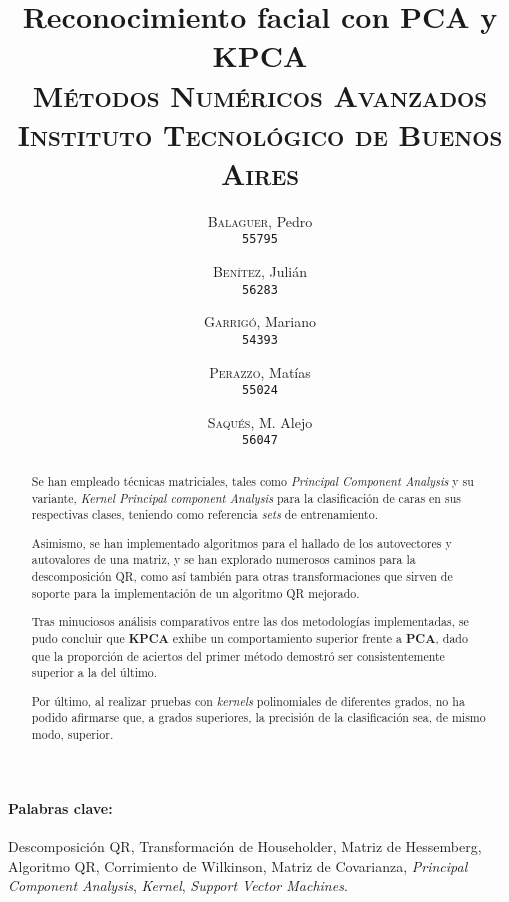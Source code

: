 \documentclass[12pt, twocolumn]{article}
\begin{document}
	\title{Reconocimiento facial con PCA y KPCA \\ 
		   \large{\textsc{Métodos Numéricos Avanzados}} \\
		   \normalsize{\textsc{Instituto Tecnológico de Buenos Aires}}}
	\author{
		\textsc{Balaguer}, Pedro \\
		\texttt{55795}
		\and
		\textsc{Benítez}, Julián \\
		\texttt{56283}
		\and
		\textsc{Garrigó}, Mariano \\
		\texttt{54393}
		\and
		\textsc{Perazzo}, Matías \\
		\texttt{55024}
		\and
		\textsc{Saqués}, M. Alejo \\
		\texttt{56047} 
	}
	\date{}
	\maketitle
	
	\begin{abstract}
		Se han empleado técnicas matriciales, tales como \textit{Principal Component Analysis} y su variante, \textit{Kernel Principal component Analysis} para la clasificación de caras en sus respectivas clases, teniendo como referencia \textit{sets} de entrenamiento.  
		
		Asimismo, se han implementado algoritmos para el hallado de los autovectores y autovalores de una matriz, y se han explorado numerosos caminos para la descomposición QR, como así también para otras transformaciones que sirven de soporte para la implementación de un algoritmo QR mejorado.   
		
		Tras minuciosos análisis comparativos entre las dos metodologías implementadas, se pudo concluir que \textbf{KPCA} exhibe un comportamiento superior frente a \textbf{PCA}, dado que la proporción de aciertos del primer método demostró ser consistentemente superior a la del último.
		
		Por último, al realizar pruebas con \textit{kernels} polinomiales de diferentes grados, no ha podido afirmarse que, a grados superiores, la precisión de la clasificación sea, de mismo modo, superior.  
	\end{abstract}
	
	\paragraph{Palabras clave:} Descomposición QR, Transformación de Householder, Matriz de Hessemberg, Algoritmo QR, Corrimiento de Wilkinson, Matriz de Covarianza, \textit{Principal Component Analysis}, \textit{Kernel}, \textit{Support Vector Machines}.
	
\end{document}
